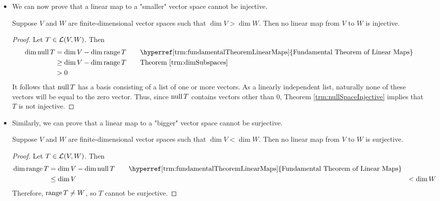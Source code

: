 \documentclass[../main.tex]{subfiles}
\begin{document}
\begin{itemize}
\begin{theorem}
\begin{proof}
            \begin{align*}
                \dim V &= m+n\\
                &= \dim\nul T+\dim\range T
            \end{align*}
            as desired.
        \end{proof}
    \end{theorem}
    \item We can now prove that a linear map to a "smaller" vector space cannot be injective.
    \begin{theorem}\label{trm:smallerNotInjective}
        Suppose $V$ and $W$ are finite-dimensional vector spaces such that $\dim V>\dim W$. Then no linear map from $V$ to $W$ is injective.
        \begin{proof}
            Let $T\in\mathcal{L}(V,W)$. Then
            \begin{align*}
                \dim\nul T &= \dim V-\dim\range T\tag*{\hyperref[trm:fundamentalTheoremLinearMaps]{Fundamental Theorem of Linear Maps}}\\
                &\geq \dim V-\dim\range T\tag*{Theorem \ref{trm:dimSubspaces}}\\
                &> 0
            \end{align*}
            It follows that $\operatorname{null} T$ has a basis consisting of a list of one or more vectors. As a linearly independent list, naturally none of these vectors will be equal to the zero vector. Thus, since $\operatorname{null} T$ contains vectors other than 0, Theorem \ref{trm:nullSpaceInjective} implies that $T$ is not injective.
        \end{proof}
    \end{theorem}
    \item Similarly, we can prove that a linear map to a "bigger" vector space cannot be surjective.
    \begin{theorem}\label{trm:biggerNotSurjective}
        Suppose $V$ and $W$ are finite-dimensional vector spaces such that $\dim V<\dim W$. Then no linear map from $V$ to $W$ is surjective.
        \begin{proof}
            Let $T\in\mathcal{L}(V,W)$. Then
            \begin{align*}
                \dim\range T &= \dim V-\dim\nul T\tag*{\hyperref[trm:fundamentalTheoremLinearMaps]{Fundamental Theorem of Linear Maps}}\\
                &\leq \dim V
                &< \dim W
            \end{align*}
            Therefore, $\operatorname{range} T\neq W$, so $T$ cannot be surjective.

\end{proof}
\end{theorem}
\end{itemize}
\end{document}
